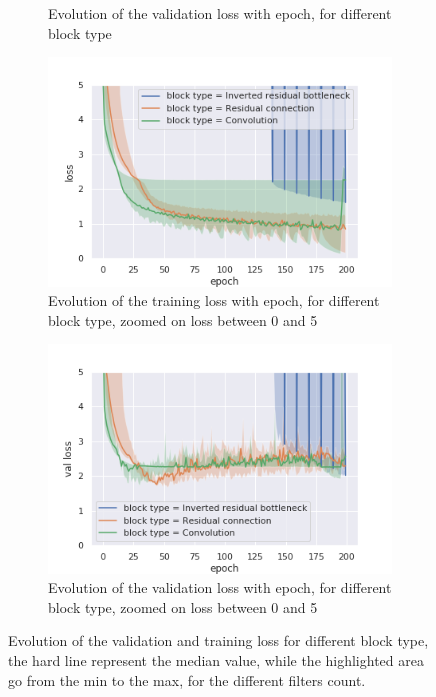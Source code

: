 \begin{figure}
\begin{center}
\begin{subfigure}[t]{.49\linewidth}
      \caption{Evolution of the validation loss with epoch, for different block type}
      \label{fig:overfitvalloss}
    \end{subfigure}
    \begin{subfigure}[t]{.49\linewidth}
      \centering
      \includegraphics[width=0.99\linewidth]{figures/all_epoch_loss_block_type_zoomed_0_5.png}
      \caption{Evolution of the training loss with epoch, for different block type, zoomed on loss between 0 and 5}
      \label{fig:overfitloss_zoom}
    \end{subfigure}
    \begin{subfigure}[t]{.49\linewidth}
      \centering
      \includegraphics[width=0.99\linewidth]{figures/all_epoch_val_loss_block_type_zoomed_0_5.png}
      \caption{Evolution of the validation loss with epoch, for different block type, zoomed on loss between 0 and 5}
      \label{fig:overfitvalloss_zoom}
    \end{subfigure}
    \caption{Evolution of the validation and training loss for different block type, the hard line represent the median value, while the highlighted area go from the min to the max, for the different filters count.}
    \label{fig:overfit}
  \end{center}
\end{figure}

